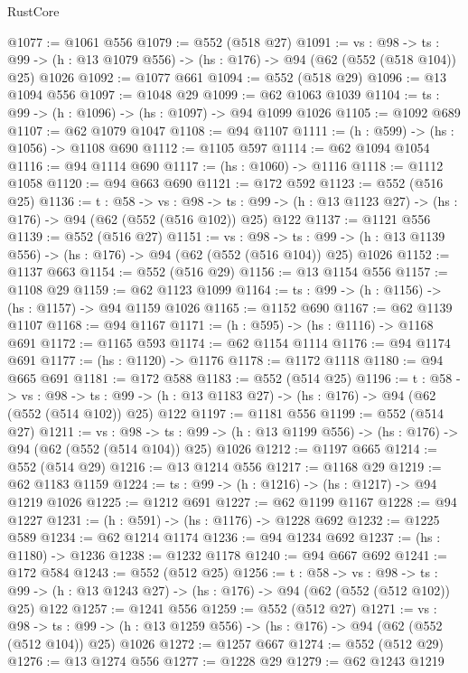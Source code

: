 \begin{lexlean}{RustCore}
\begin{coremodule}
@1077 := @1061 @556
@1079 := @552 (@518 @27)
@1091 := {vs : @98} ->
  {ts : @99} -> (h : @13 @1079 @556) -> (hs : @176) -> @94 (@62 (@552 (@518 @104)) @25) @1026
@1092 := @1077 @661
@1094 := @552 (@518 @29)
@1096 := @13 @1094 @556
@1097 := @1048 @29
@1099 := @62 @1063 @1039
@1104 := {ts : @99} -> (h : @1096) -> (hs : @1097) -> @94 @1099 @1026
@1105 := @1092 @689
@1107 := @62 @1079 @1047
@1108 := @94 @1107
@1111 := (h : @599) -> (hs : @1056) -> @1108 @690
@1112 := @1105 @597
@1114 := @62 @1094 @1054
@1116 := @94 @1114 @690
@1117 := (hs : @1060) -> @1116
@1118 := @1112 @1058
@1120 := @94 @663 @690
@1121 := @172 @592
@1123 := @552 (@516 @25)
@1136 := {t : @58} ->
  {vs : @98} ->
  {ts : @99} -> (h : @13 @1123 @27) -> (hs : @176) -> @94 (@62 (@552 (@516 @102)) @25) @122
@1137 := @1121 @556
@1139 := @552 (@516 @27)
@1151 := {vs : @98} ->
  {ts : @99} -> (h : @13 @1139 @556) -> (hs : @176) -> @94 (@62 (@552 (@516 @104)) @25) @1026
@1152 := @1137 @663
@1154 := @552 (@516 @29)
@1156 := @13 @1154 @556
@1157 := @1108 @29
@1159 := @62 @1123 @1099
@1164 := {ts : @99} -> (h : @1156) -> (hs : @1157) -> @94 @1159 @1026
@1165 := @1152 @690
@1167 := @62 @1139 @1107
@1168 := @94 @1167
@1171 := (h : @595) -> (hs : @1116) -> @1168 @691
@1172 := @1165 @593
@1174 := @62 @1154 @1114
@1176 := @94 @1174 @691
@1177 := (hs : @1120) -> @1176
@1178 := @1172 @1118
@1180 := @94 @665 @691
@1181 := @172 @588
@1183 := @552 (@514 @25)
@1196 := {t : @58} ->
  {vs : @98} ->
  {ts : @99} -> (h : @13 @1183 @27) -> (hs : @176) -> @94 (@62 (@552 (@514 @102)) @25) @122
@1197 := @1181 @556
@1199 := @552 (@514 @27)
@1211 := {vs : @98} ->
  {ts : @99} -> (h : @13 @1199 @556) -> (hs : @176) -> @94 (@62 (@552 (@514 @104)) @25) @1026
@1212 := @1197 @665
@1214 := @552 (@514 @29)
@1216 := @13 @1214 @556
@1217 := @1168 @29
@1219 := @62 @1183 @1159
@1224 := {ts : @99} -> (h : @1216) -> (hs : @1217) -> @94 @1219 @1026
@1225 := @1212 @691
@1227 := @62 @1199 @1167
@1228 := @94 @1227
@1231 := (h : @591) -> (hs : @1176) -> @1228 @692
@1232 := @1225 @589
@1234 := @62 @1214 @1174
@1236 := @94 @1234 @692
@1237 := (hs : @1180) -> @1236
@1238 := @1232 @1178
@1240 := @94 @667 @692
@1241 := @172 @584
@1243 := @552 (@512 @25)
@1256 := {t : @58} ->
  {vs : @98} ->
  {ts : @99} -> (h : @13 @1243 @27) -> (hs : @176) -> @94 (@62 (@552 (@512 @102)) @25) @122
@1257 := @1241 @556
@1259 := @552 (@512 @27)
@1271 := {vs : @98} ->
  {ts : @99} -> (h : @13 @1259 @556) -> (hs : @176) -> @94 (@62 (@552 (@512 @104)) @25) @1026
@1272 := @1257 @667
@1274 := @552 (@512 @29)
@1276 := @13 @1274 @556
@1277 := @1228 @29
@1279 := @62 @1243 @1219

\end{coremodule}
\end{lexlean}
